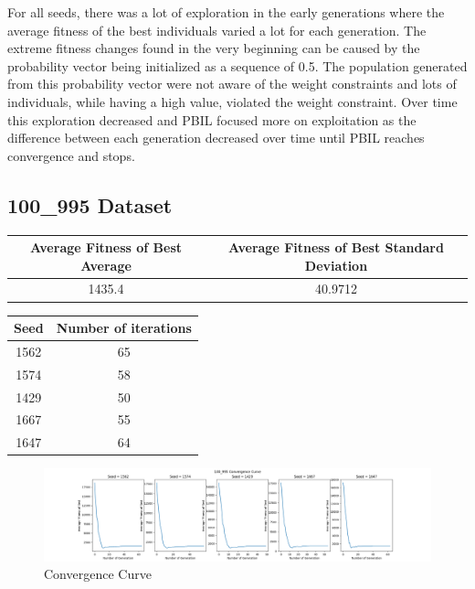 \documentclass{article}
\begin{document}
\noindent For all seeds, there was a lot of exploration in the early generations where the average fitness of the best individuals varied a lot for each generation. The extreme fitness changes found in the very beginning can be caused by the probability vector being initialized as a sequence of 0.5. The population generated from this probability vector were not aware of the weight constraints and lots of individuals, while having a high value, violated the weight constraint. Over time this exploration decreased and PBIL focused more on exploitation as the difference between each generation decreased over time until PBIL reaches convergence and stops. \par

\subsection*{100\_995 Dataset}
\begin{center}
	\begin{tabular}{|c|c|}
		\hline
		Average Fitness of Best Average & Average Fitness of Best Standard Deviation \\
		\hline
		1435.4 & 40.9712 \\
		\hline
	\end{tabular}
\end{center}

\begin{center}
	\begin{tabular}{|c|c|}
		\hline
		Seed & Number of iterations \\
		\hline
		1562 & 65 \\
		\hline
		1574 & 58 \\
		\hline
		1429 & 50 \\
		\hline
		1667 & 55 \\
		\hline
		1647 & 64 \\
		\hline
	\end{tabular}
\end{center}

\begin{figure}[h!]
	\centering
	\includegraphics[width=\linewidth]{knapsack_100_995.png}
	\caption{Convergence Curve}
\end{figure}
\end{document}
